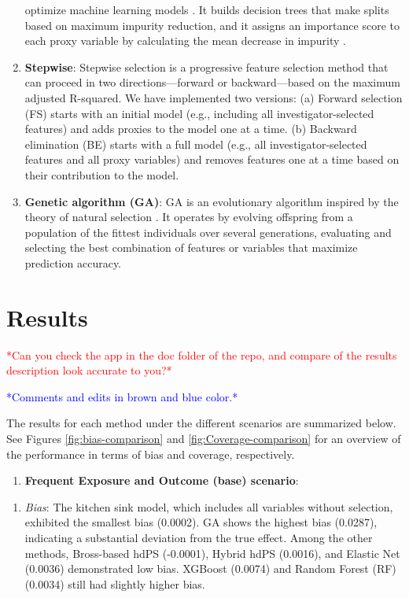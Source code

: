 \documentclass[sn-vancouver,Numbered,lineno,pdflatex]{sn-jnl}
\providecommand{\tightlist}{%
  \setlength{\itemsep}{0pt}\setlength{\parskip}{0pt}}
\begin{document}
\begin{enumerate}
  optimize machine learning models \citep{chen2016xgboost}. It builds
  decision trees that make splits based on maximum impurity reduction,
  and it assigns an importance score to each proxy variable by
  calculating the mean decrease in impurity
  \citep{xiao2024interpretable}.
\item
  \textbf{Stepwise}: Stepwise selection is a progressive feature
  selection method that can proceed in two directions---forward or
  backward---based on the maximum adjusted R-squared. We have
  implemented two versions: (a) Forward selection (FS) starts with an
  initial model (e.g., including all investigator-selected features) and
  adds proxies to the model one at a time. (b) Backward elimination (BE)
  starts with a full model (e.g., all investigator-selected features and
  all proxy variables) and removes features one at a time based on their
  contribution to the model.
\item
  \textbf{Genetic algorithm (GA)}: GA is an evolutionary algorithm
  inspired by the theory of natural selection
  \citep{holland1975adaptation}. It operates by evolving offspring from
  a population of the fittest individuals over several generations,
  evaluating and selecting the best combination of features or variables
  that maximize prediction accuracy.
\end{enumerate}

\section{Results}\label{results}

\textcolor{red}{*Can you check the app in the doc folder of the repo, and compare of the results description look accurate to you?*}

\textcolor{blue}{*Comments and edits in brown and blue color.*}

The results for each method under the different scenarios are summarized
below. See Figures \ref{fig:bias-comparison} and
\ref{fig:Coverage-comparison} for an overview of the performance in
terms of bias and coverage, respectively.

\begin{enumerate}
\def\labelenumi{(\roman{enumi})}
\tightlist
\item
  \textbf{Frequent Exposure and Outcome (base) scenario}:
\end{enumerate}

\begin{enumerate}
\def\labelenumi{\arabic{enumi}.}
\tightlist
\item
  \emph{Bias}: The kitchen sink model, which includes all variables
  without selection, exhibited the smallest bias (0.0002). GA shows the
  highest bias (0.0287), indicating a substantial deviation from the
  true effect. Among the other methods, Bross-based hdPS (-0.0001),
  Hybrid hdPS (0.0016), and Elastic Net (0.0036) demonstrated low bias.
  XGBoost (0.0074) and Random Forest (RF) (0.0034) still had slightly
  higher bias.
\end{enumerate}
\end{document}
